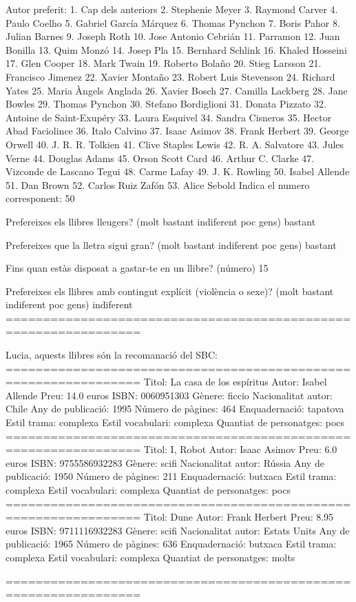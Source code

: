 Autor preferit: 
  1. Cap dels anteriors
  2. Stephenie Meyer
  3. Raymond Carver
  4. Paulo Coelho
  5. Gabriel García Márquez
  6. Thomas Pynchon
  7. Boris Pahor
  8. Julian Barnes
  9. Joseph Roth
  10. Jose Antonio Cebrián
  11. Parramon
  12. Juan Bonilla
  13. Quim Monzó
  14. Josep Pla
  15. Bernhard Schlink
  16. Khaled Hosseini
  17. Glen Cooper
  18. Mark Twain
  19. Roberto Bolaño
  20. Stieg Larsson
  21. Francisco Jimenez
  22. Xavier Montaño
  23. Robert Luis Stevenson
  24. Richard Yates
  25. Maria Àngels Anglada
  26. Xavier Bosch
  27. Camilla Lackberg
  28. Jane Bowles
  29. Thomas Pynchon
  30. Stefano Bordiglioni
  31. Donata Pizzato
  32. Antoine de Saint-Exupéry
  33. Laura Esquivel
  34. Sandra Cisneros
  35. Hector Abad Faciolince
  36. Italo Calvino
  37. Isaac Asimov
  38. Frank Herbert
  39. George Orwell
  40. J. R. R. Tolkien
  41. Clive Staples Lewis
  42. R. A. Salvatore
  43. Jules Verne
  44. Douglas Adams
  45. Orson Scott Card
  46. Arthur C. Clarke
  47. Vizconde de Lascano Tegui
  48. Carme Lafay
  49. J. K. Rowling
  50. Isabel Allende
  51. Dan Brown
  52. Carlos Ruiz Zafón
  53. Alice Sebold
Indica el numero corresponent: 50

Prefereixes els llibres lleugers? (molt bastant indiferent poc gens) bastant

Prefereixes que la lletra sigui gran? (molt bastant indiferent poc gens) bastant

Fins quan estàs disposat a gastar-te en un llibre? (número) 15

Prefereixes els llibres amb contingut explícit (violència o sexe)? (molt bastant indiferent poc gens) indiferent
================================================================

Lucia, 
aquests llibres són la recomanació del SBC: 
================================================================
Titol:                   La casa de los espíritus
Autor:                   Isabel Allende
Preu:                    14.0 euros
ISBN:                    0060951303
Gènere:                  ficcio
Nacionalitat autor:      Chile
Any de publicació:       1995
Número de pàgines:       464
Enquadernació:           tapatova
Estil trama:             complexa
Estil vocabulari:        complexa
Quantiat de personatges: pocs
================================================================
Titol:                   I, Robot
Autor:                   Isaac Asimov
Preu:                    6.0 euros
ISBN:                    9755586932283
Gènere:                  scifi
Nacionalitat autor:      Rússia
Any de publicació:       1950
Número de pàgines:       211
Enquadernació:           butxaca
Estil trama:             complexa
Estil vocabulari:        complexa
Quantiat de personatges: pocs
================================================================
Titol:                   Dune
Autor:                   Frank Herbert
Preu:                    8.95 euros
ISBN:                    9711116932283
Gènere:                  scifi
Nacionalitat autor:      Estats Units
Any de publicació:       1965
Número de pàgines:       636
Enquadernació:           butxaca
Estil trama:             complexa
Estil vocabulari:        complexa
Quantiat de personatges: molts

================================================================


